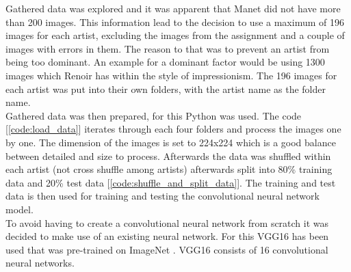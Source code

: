  Gathered data was explored and it was apparent that Manet did not have more than 200 images. This information lead to the decision to use a maximum of 196 images for each artist, excluding the images from the assignment and a couple of images with errors in them. The reason to that was to prevent an artist from being too dominant. An example for a dominant factor would be using 1300 images which Renoir has within the style of impressionism. The 196 images for each artist was put into their own folders, with the artist name as the folder name.\\

 Gathered data was then prepared, for this Python was used. The code [\ref{code:load_data}] iterates through each four folders and process the images one by one. The dimension of the images is set to 224x224 which is a good balance between detailed and size to process. Afterwards the data was shuffled within each artist (not cross shuffle among artists) afterwards split into 80\% training data and 20\% test data [\ref{code:shuffle_and_split_data}]. The training and test data is then used for training and testing the convolutional neural network model.\\

 To avoid having to create a convolutional neural network from scratch it was decided to make use of an existing neural network. For this VGG16 \cite{DBLP:journals/corr/SimonyanZ14a} has been used that was pre-trained on ImageNet \cite{imagenet_cvpr09}. VGG16 consists of 16 convolutional neural networks.\\

